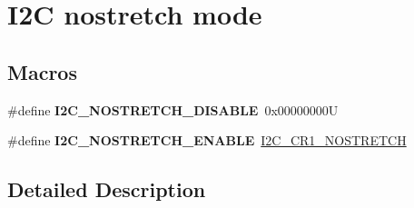 \hypertarget{group___i2_c__nostretch__mode}{}\section{I2C nostretch mode}
\label{group___i2_c__nostretch__mode}
\subsection*{Macros}
\begin{DoxyCompactItemize}
\item 
\mbox{\label{group___i2_c__nostretch__mode_ga611deefe89e56fa65f853e6796f2cf66}} 
\#define {\bfseries I2\+C\+\_\+\+N\+O\+S\+T\+R\+E\+T\+C\+H\+\_\+\+D\+I\+S\+A\+B\+LE}~0x00000000U
\item 
\mbox{\label{group___i2_c__nostretch__mode_ga67ebace1182d99bb5d7968994c01c80e}} 
\#define {\bfseries I2\+C\+\_\+\+N\+O\+S\+T\+R\+E\+T\+C\+H\+\_\+\+E\+N\+A\+B\+LE}~\hyperlink{group___peripheral___registers___bits___definition_ga197aaca79f64e832af3a0a0864c2a08c}{I2\+C\+\_\+\+C\+R1\+\_\+\+N\+O\+S\+T\+R\+E\+T\+CH}
\end{DoxyCompactItemize}


\subsection{Detailed Description}
